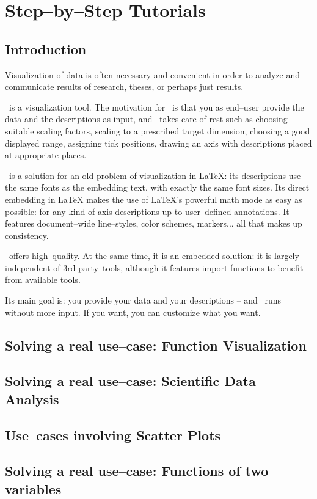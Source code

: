 
\chapter{Step--by--Step Tutorials}
{%
%

\section{Introduction}
Visualization of data is often necessary and convenient in order to analyze and communicate results of research, theses, or perhaps just results.

\PGFPlots\ is a visualization tool. The motivation for \PGFPlots\ is that you as end--user provide the data and the descriptions as input, and \PGFPlots\ takes care of rest such as choosing suitable scaling factors, scaling to a prescribed target dimension, choosing a good displayed range, assigning tick positions, drawing an axis with descriptions placed at appropriate places.

\PGFPlots\ is a solution for an old problem of visualization in LaTeX: its descriptions use the same fonts as the embedding text, with exactly the same font sizes. Its direct embedding in LaTeX makes the use of LaTeX's powerful math mode as easy as possible: for any kind of axis descriptions up to user--defined annotations. It features document--wide line--styles, color schemes, markers... all that makes up consistency. 

\PGFPlots\ offers high--quality. At the same time, it is an embedded solution: it is largely independent of 3rd party--tools, although it features import functions to benefit from available tools.

Its main goal is: you provide your data and your descriptions -- and \PGFPlots\ runs without more input. If you want, you can customize what you want.

\section{Solving a real use--case: Function Visualization}



\section{Solving a real use--case: Scientific Data Analysis}



\section{Use--cases involving Scatter Plots}



\section{Solving a real use--case: Functions of two variables}


}%
\endinput
